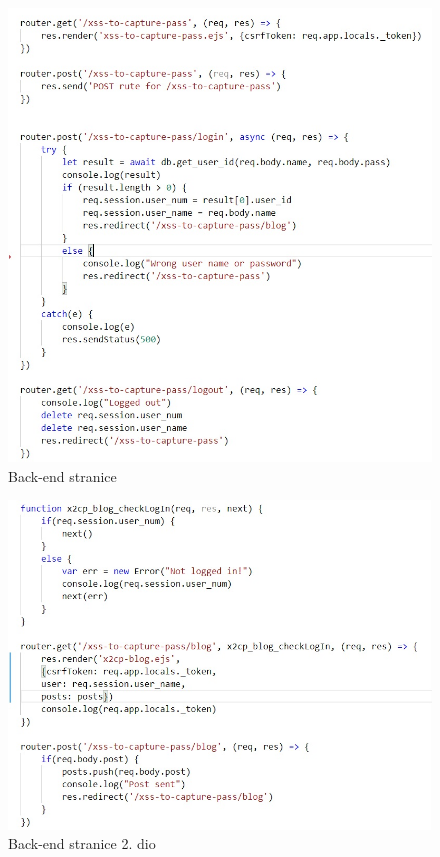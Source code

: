 \documentclass[12pt, oneside, onecolumn]{book}
\begin{document}
{\begin{figure}[H]
	\begin{center}
		\includegraphics[width=17cm]{xss2cp_b1.jpg}
		\caption{Back-end stranice} \label{fig:xss2cp_b1}
	\end{center}
\end{figure}

\begin{figure}[H]
	\begin{center}
		\includegraphics[width=17cm]{xss2cp_b2.jpg}
		\caption{Back-end stranice 2. dio} \label{fig:xss2cp_b2}
	\end{center}
\end{figure} 

}
\end{document}
